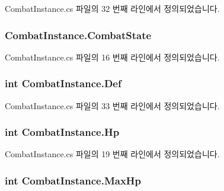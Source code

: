 Combat\+Instance.\+cs 파일의 32 번째 라인에서 정의되었습니다.

\subsubsection[{\texorpdfstring{Combat\+State}{CombatState}}]{ Combat\+Instance.\+Combat\+State\hspace{0.3cm}{\ttfamily [get]}}\hypertarget{class_combat_instance_a149d2068f3dc0ec72f3461d101dcebab}{}\label{class_combat_instance_a149d2068f3dc0ec72f3461d101dcebab}


Combat\+Instance.\+cs 파일의 16 번째 라인에서 정의되었습니다.

\subsubsection[{\texorpdfstring{Def}{Def}}]{\setlength{\rightskip}{0pt plus 5cm}int Combat\+Instance.\+Def\hspace{0.3cm}{\ttfamily [get]}}\hypertarget{class_combat_instance_ab52acfd86a70be3647d2f092e6816190}{}\label{class_combat_instance_ab52acfd86a70be3647d2f092e6816190}


Combat\+Instance.\+cs 파일의 33 번째 라인에서 정의되었습니다.

\subsubsection[{\texorpdfstring{Hp}{Hp}}]{\setlength{\rightskip}{0pt plus 5cm}int Combat\+Instance.\+Hp\hspace{0.3cm}{\ttfamily [get]}}\hypertarget{class_combat_instance_ae4682b727ea05a59141f747341877eb6}{}\label{class_combat_instance_ae4682b727ea05a59141f747341877eb6}


Combat\+Instance.\+cs 파일의 19 번째 라인에서 정의되었습니다.

\subsubsection[{\texorpdfstring{Max\+Hp}{MaxHp}}]{\setlength{\rightskip}{0pt plus 5cm}int Combat\+Instance.\+Max\+Hp\hspace{0.3cm}{\ttfamily [get]}}\hypertarget{class_combat_instance_a33c5218456253d1a5c457fe6364b10d7}{}\label{class_combat_instance_a33c5218456253d1a5c457fe6364b10d7}


